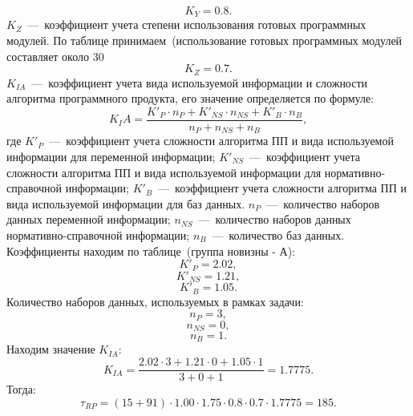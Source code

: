             \begin{equation*}
                K_Y = 0.8.
            \end{equation*}
            $K_Z$~---~коэффициент учета степени использования готовых программных модулей. По таблице принимаем~(использование готовых программных модулей составляет около 30%
            \begin{equation*}
                K_Z = 0.7.
            \end{equation*}
            $K_{IA}$~---~коэффициент учета вида используемой информации и сложности алгоритма программного продукта, его значение определяется по формуле:
            \begin{equation}
                K_IA = \dfrac {K'_P \cdot n_P + K'_{NS} \cdot n_{NS} + K'_B \cdot n_B} {n_P + n_{NS} + n_B },
            \end{equation}
            где $K'_P$~---~коэффициент учета сложности алгоритма ПП и вида используемой информации для переменной информации;
            $K'_{NS}$~---~коэффициент учета сложности алгоритма ПП и вида используемой информации для нормативно-справочной информации;
            $K'_B$~---~коэффициент учета сложности алгоритма ПП и вида используемой информации для баз данных.
            $n_P$~---~количество наборов данных переменной информации;
            $n_{NS}$~---~количество наборов данных нормативно-справочной информации;
            $n_B$~---~количество баз данных.
            Коэффициенты находим по таблице~(группа новизны - А):
            \begin{equation*}
                K'_P=2.02,
            \end{equation*}
            \begin{equation*}
                K'_{NS}=1.21,
            \end{equation*}
            \begin{equation*}
                K'_B=1.05.
            \end{equation*}
            Количество наборов данных, используемых в рамках задачи:
            \begin{equation*}
                n_P=3,
            \end{equation*}
            \begin{equation*}
                n_{NS}=0,
            \end{equation*}
            \begin{equation*}
                n_B=1.
            \end{equation*}
            Находим значение $K_{IA}$:
            \begin{equation*}
                K_{IA} = \dfrac{2.02 \cdot 3+1.21 \cdot 0+1.05 \cdot 1}{3+0+1}=1.7775.
            \end{equation*}
            Тогда:
            \begin{equation*}
                \tau_{RP} = (15+91)\cdot 1.00 \cdot 1.75 \cdot 0.8 \cdot 0.7 \cdot 1.7775 = 185.
            \end{equation*}

